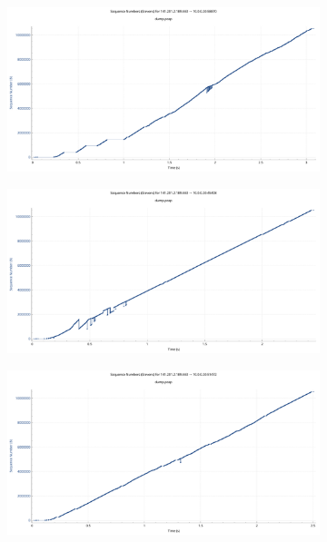 \documentclass[
    pdftex,
    12pt,
    parskip=half,
    a4paper
]{scrartcl}
\begin{document}
\begin{figure}
\begin{subfigure}{0.5\textwidth}
	\end{subfigure}
	\begin{subfigure}{0.5\textwidth}
		\includegraphics[width=1\textwidth]{../1/wireshark/constant4.pdf}
	\end{subfigure}
	\begin{subfigure}{0.5\textwidth}
		\includegraphics[width=1\textwidth]{../1/wireshark/constant5.pdf}
	\end{subfigure}
	\begin{subfigure}{0.5\textwidth}
		\includegraphics[width=1\textwidth]{../1/wireshark/constant6.pdf}

\end{subfigure}
\end{figure}
\end{document}
